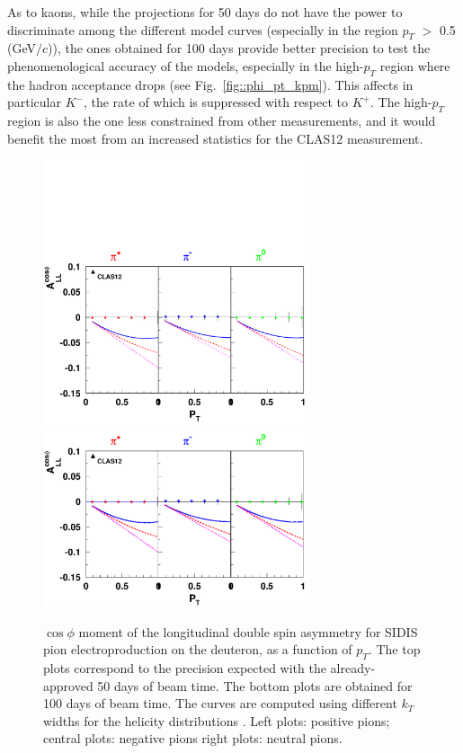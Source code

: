 As to kaons, while the projections for 50 days do not have the power to discriminate among the different model curves (especially in the region $p_T$ $>$ 0.5 (GeV$/c$)), the ones obtained for 100 days provide better precision to test the phenomenological accuracy of the models, especially in the high-$p_T$ region where the hadron acceptance drops (see Fig.~\ref{fig::phi_pt_kpm}). This affects in particular $K^-$, the rate of which is suppressed with respect to $K^+$. 
The high-$p_T$ region is also the one less constrained from other measurements, and it would benefit the most from an increased statistics for the CLAS12 measurement. 
%
\begin{figure}
\centering
\includegraphics[width=0.7\textwidth]{sidis/allpt11cosdeut-eps-converted-to.pdf}
\includegraphics[width=0.7\textwidth]{sidis/all_pions_x2.pdf}
\caption{\label{fig::ALLptcosdeutpionsx2}$\cos\phi$ moment of the longitudinal double spin asymmetry for SIDIS pion electroproduction on the deuteron, as a function of $p_T$. The top plots correspond to the precision expected with the already-approved 50 days of beam time. The bottom plots are obtained for 100 days of beam time. The curves are computed using different $k_T$ widths for the helicity distributions \cite{torino_models}. Left plots: positive pions; central plots: negative pions right plots: neutral pions.}
\end{figure}
